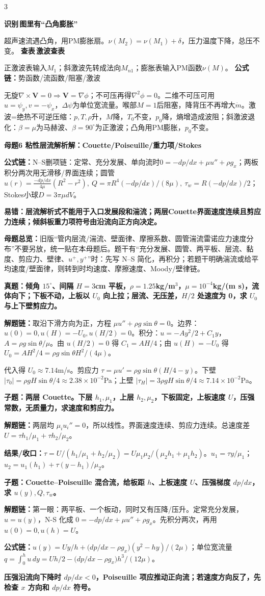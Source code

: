 \documentclass[a4paper]{article}
\newcommand{\mt}[1]{\vspace{0.22pt}\colorbox{M}{\parbox{\dimexpr\linewidth-2\fboxsep}{\color{white}\bfseries #1}}\par}
\newcommand{\qt}[1]{\vspace{0.10pt}\colorbox{Q}{\parbox{\dimexpr\linewidth-2\fboxsep}{\color{white}\bfseries #1}}\par}
\newcommand{\ans}[1]{\colorbox{G}{\parbox{\dimexpr\linewidth-2\fboxsep}{#1}}\par}
\newcommand{\warn}[1]{\colorbox{Y}{\parbox{\dimexpr\linewidth-2\fboxsep}{\color{E}\bfseries #1}}\par}
\newcommand{\chain}[1]{{\color{A}\bfseries 解题链：}#1\par}
\newcommand{\res}[1]{{\color{E}\bfseries 结果/收口：}#1\par}
\newcommand{\form}[1]{{\color{M}\bfseries 公式链：}#1\par}
\newcommand{\labtag}[3]{{\bfseries\color{#1}\colorbox{#1}{\color{white}\fontsize{2.18}{2.28}\selectfont #2}\,#3}\par}
\newcommand{\iden}[1]{\labtag{C}{识别}{#1}}
\newcommand{\lookup}[1]{\labtag{C}{查表}{#1}}
\newcommand{\mview}[1]{\ans{\textbf{母题总览：}#1}}
\newcommand{\idq}[1]{\iden{#1}}
\newcommand{\formq}[1]{\form{#1}}
\newcommand{\lookq}[1]{\lookup{#1}}
\newenvironment{vfourWrap}{\par\begingroup\fontsize{2.66}{2.80}\selectfont\setlength{\fboxsep}{0.38pt}}{\par\endgroup}
\begin{document}
\begin{multicols}{3}
\begin{vfourWrap}
\idq{图里有“凸角膨胀”}
超声速流遇凸角，用PM膨胀扇。$\nu(M_2)=\nu(M_1)+\delta$，压力温度下降，总压不变。
\lookq{激波查表}
正激波表输入$M_1$；斜激波先转成法向$M_{n1}$；膨胀表输入PM函数$\nu(M)$。
\formq{势函数/流函数/阻塞/激波}
无旋$\nabla\times\bm V=0\Rightarrow\bm V=\nabla\phi$；不可压再得$\nabla^2\phi=0$。二维不可压可用$u=\psi_y,v=-\psi_x$，$\Delta\psi$为单位宽流量。喉部$M=1$后阻塞，降背压不再增大$\dot m$。激波=绝热不可逆压缩：$p,T,\rho$升，$M$降，$T_0$不变，$p_0$降，熵增造成波阻；斜激波退化：$\beta=\mu$为马赫波、$\beta=90^\circ$为正激波；凸角用PM膨胀，$p_0$不变。
\end{vfourWrap}
\mt{母题6 粘性层流解析解：Couette/Poiseuille/重力项/Stokes}
\form{N--S删项链：定常、充分发展、单向流时$0=-dp/dx+\mu u''+\rho g_x$；两板积分两次用无滑移/界面连续；圆管$u(r)=\frac{-dp/dx}{4\mu}(R^2-r^2),\ Q=\pi R^4(-dp/dx)/(8\mu),\ \tau_w=R(-dp/dx)/2$；Stokes小球$D=3\pi\mu dV$。}
\warn{易错：层流解析式不能用于入口发展段和湍流；两层Couette界面速度连续且剪应力连续；倾斜板重力项符号由沿流向正方向决定。}
\mview{旧版“管内层流/湍流、壁面律、摩擦系数、圆管湍流雷诺应力速度分布”不要另放，统一贴在本母题后。题干有“充分发展、圆管、两平板、层流、黏度、剪应力、壁律、$u^+,y^+$”时：先写 N--S 简化，再积分；若题干明确湍流或给平均速度/壁面律，则转到时均速度、摩擦速度、Moody/壁律链。}
\qt{真题：倾角 $15^\circ$、间隔 $H=3$cm 平板，$\rho=1.25$kg/m$^3$，$\mu=10^{-4}$kg/(m s)，流体向下；下板不动，上板以 $U_0$ 向上拉；层流、无压差，$H/2$ 处速度为 0，求 $U_0$ 与上下壁剪应力。}
\chain{取沿下滑方向为正，方程 $\mu u''+\rho g\sin\theta=0$。边界：$u(0)=0,u(H)=-U_0,u(H/2)=0$。积分：$u=-Ay^2/2+C_1y$，$A=\rho g\sin\theta/\mu$。由 $u(H/2)=0$ 得 $C_1=AH/4$；由 $u(H)=-U_0$ 得 $U_0=AH^2/4=\rho g\sin\theta H^2/(4\mu)$。}
\ans{代入得 $U_0\approx7.14$m/s。剪应力 $\tau=\mu u'=\rho g\sin\theta(H/4-y)$。下壁 $|\tau_0|=\rho gH\sin\theta/4\approx2.38\times10^{-2}$Pa；上壁 $|\tau_H|=3\rho gH\sin\theta/4\approx7.14\times10^{-2}$Pa。}

\qt{子题：两层 Couette。下层 $h_1,\mu_1$，上层 $h_2,\mu_2$，下板固定，上板速度 $U$，压强常数，无质量力，求速度和剪应力。}
\chain{两层均 $\mu_i u_i''=0$，所以线性。界面速度连续、剪应力连续。总速度差 $U=\tau h_1/\mu_1+\tau h_2/\mu_2$。}
\res{$\tau=U/(h_1/\mu_1+h_2/\mu_2)=U\mu_1\mu_2/(\mu_2h_1+\mu_1h_2)$。$u_1=\tau y/\mu_1$；$u_2=u_1(h_1)+\tau(y-h_1)/\mu_2$。}

\qt{子题：Couette--Poiseuille 混合流，给板距 $h$、上板速度 $U$、压强梯度 $dp/dx$，求 $u(y),Q,\tau_w$。}
\chain{第一眼：两平板、一个板动，同时又有压降/压升。定常充分发展，$u=u(y)$，N-S 化成 $0=-dp/dx+\mu u''+\rho g_x$。先积分两次，再用 $u(0)=0,u(h)=U$。}
\form{$u(y)=Uy/h+\big(dp/dx-\rho g_x\big)(y^2-hy)/(2\mu)$；单位宽流量 $q=\int_0^hu\,dy=Uh/2-\big(dp/dx-\rho g_x\big)h^3/(12\mu)$。}
\warn{压强沿流向下降时 $dp/dx<0$，Poiseuille 项应推动正向流；若速度方向反了，先检查 $x$ 方向和 $dp/dx$ 符号。}


\end{multicols}
\end{document}
